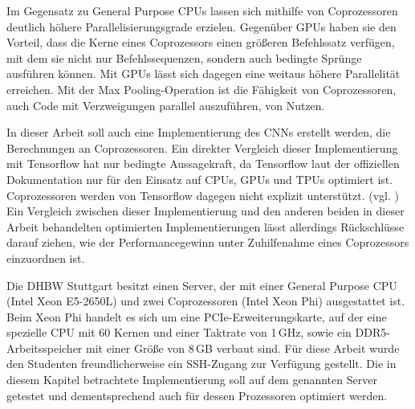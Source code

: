 \documentclass[../main.tex]{subfiles}
\begin{document}
Im Gegensatz zu General Purpose CPUs lassen sich mithilfe von Coprozessoren deutlich höhere Parallelisierungsgrade erzielen. Gegenüber GPUs haben sie den Vorteil, dass die Kerne eines Coprozessors einen größeren Befehlssatz verfügen, mit dem sie nicht nur Befehlssequenzen, sondern auch bedingte Sprünge ausführen können. Mit GPUs lässt sich dagegen eine weitaus höhere Parallelität erreichen. Mit der Max Pooling-Operation ist die Fähigkeit von Coprozessoren, auch Code mit Verzweigungen parallel auszuführen, von Nutzen. 

In dieser Arbeit soll auch eine Implementierung des CNNs erstellt werden, die Berechnungen an Coprozessoren. Ein direkter Vergleich dieser Implementierung mit Tensorflow hat nur bedingte Aussagekraft, da Tensorflow laut der offiziellen Dokumentation nur für den Einsatz auf CPUs, GPUs und TPUs optimiert ist. Coprozessoren werden von Tensorflow dagegen nicht explizit unterstützt. (vgl. \cite{aboutTensorflow}) Ein Vergleich zwischen dieser Implementierung und den anderen beiden in dieser Arbeit behandelten optimierten Implementierungen lässt allerdings Rückschlüsse darauf ziehen, wie der Performancegewinn unter Zuhilfenahme eines Coprozessors einzuordnen ist. 

Die DHBW Stuttgart besitzt einen Server, der mit einer General Purpose CPU (Intel Xeon E5-2650L) und zwei Coprozessoren (Intel Xeon Phi) ausgestattet ist. Beim Xeon Phi handelt es sich um eine PCIe-Erweiterungskarte, auf der eine spezielle CPU mit 60 Kernen und einer Taktrate von 1\,GHz, sowie ein DDR5-Arbeitsspeicher mit einer Größe von 8\,GB verbaut sind. Für diese Arbeit wurde den Studenten freundlicherweise ein SSH-Zugang zur Verfügung gestellt. Die in diesem Kapitel betrachtete Implementierung soll auf dem genannten Server getestet und dementsprechend auch für dessen Prozessoren optimiert werden. 
\end{document}
